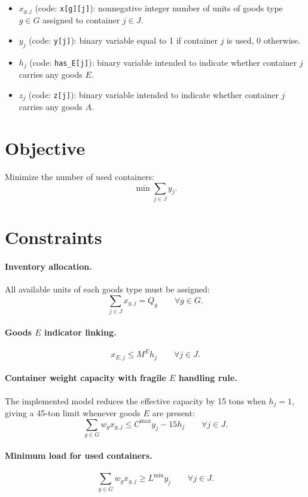 \begin{itemize}
    \item $x_{g,j}$ (code: \texttt{x[g][j]}): nonnegative integer number of units of goods type $g \in G$ assigned to container $j \in J$.
    \item $y_j$ (code: \texttt{y[j]}): binary variable equal to 1 if container $j$ is used, 0 otherwise.
    \item $h_j$ (code: \texttt{has\_E[j]}): binary variable intended to indicate whether container $j$ carries any goods $E$.
    \item $z_j$ (code: \texttt{z[j]}): binary variable intended to indicate whether container $j$ carries any goods $A$.
\end{itemize}

\section*{Objective}

Minimize the number of used containers:
\[
\min \sum_{j \in J} y_j .
\]

\section*{Constraints}

\paragraph{Inventory allocation.}
All available units of each goods type must be assigned:
\[
\sum_{j \in J} x_{g,j} = Q_g \qquad \forall g \in G.
\]

\paragraph{Goods \(E\) indicator linking.}
\[
x_{E,j} \le M^E h_j \qquad \forall j \in J.
\]

\paragraph{Container weight capacity with fragile \(E\) handling rule.}
The implemented model reduces the effective capacity by 15 tons when $h_j=1$, giving a 45-ton limit whenever goods $E$ are present:
\[
\sum_{g \in G} w_g x_{g,j} \le C^{\max} y_j - 15 h_j
\qquad \forall j \in J.
\]

\paragraph{Minimum load for used containers.}
\[
\sum_{g \in G} w_g x_{g,j} \ge L^{\min} y_j
\qquad \forall j \in J.
\]

